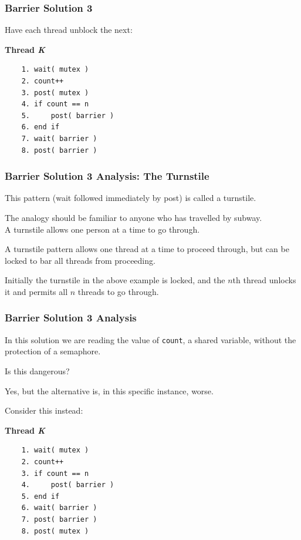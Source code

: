 \begin{frame}[fragile]
\frametitle{Barrier Solution 3}

Have each thread unblock the next:

\textbf{Thread \textit{K}}\vspace{-6em}
  \begin{verbatim}
	1. wait( mutex )
	2. count++
	3. post( mutex )
	4. if count == n
	5.     post( barrier )
	6. end if
	7. wait( barrier )
	8. post( barrier )
  \end{verbatim}
\vspace{-2em}


\end{frame}

\begin{frame}
\frametitle{Barrier Solution 3 Analysis: The Turnstile}

This pattern (wait followed immediately by post) is called a \alert{turnstile}.

The analogy should be familiar to anyone who has travelled by subway.\\
\quad A turnstile allows one person at a time to go through. 

A turnstile pattern allows one thread at a time to proceed through, but can be locked to bar all threads from proceeding. 

Initially the turnstile in the above example is locked, and the $n$th thread unlocks it and permits all $n$ threads to go through.

\end{frame}

\begin{frame}[fragile]
\frametitle{Barrier Solution 3 Analysis}

In this solution we are reading the value of \texttt{count}, a shared variable, without the protection of a semaphore. 

Is this dangerous? 

Yes, but the alternative is, in this specific instance, worse. 

Consider this instead:

\textbf{Thread \textit{K}}\vspace{-2em}
  \begin{verbatim}
	1. wait( mutex )
	2. count++
	3. if count == n
	4.     post( barrier )
	5. end if
	6. wait( barrier )
	7. post( barrier )
	8. post( mutex )
  \end{verbatim}
\vspace{-2em}

\end{frame}

